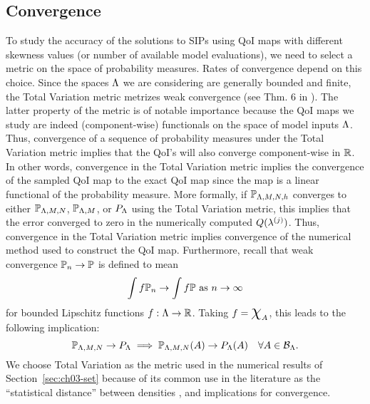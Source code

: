 \subsection{Convergence}
To study the accuracy of the solutions to SIPs using QoI maps with different skewness values (or number of available model evaluations), we need to select a metric on the space of probability measures.
Rates of convergence depend on this choice.
Since the spaces ${\Lambda}$ we are considering are generally bounded and finite, the Total Variation metric metrizes weak convergence (see Thm. 6 in \cite{GS02}).
The latter property of the metric is of notable importance because the QoI maps we study are indeed (component-wise) functionals on the space of model inputs ${\Lambda}$.
Thus, convergence of a sequence of probability measures under the Total Variation metric implies that the QoI's will also converge component-wise in $\mathbb{R}$.
In other words, convergence in the Total Variation metric implies the convergence of the sampled QoI map to the exact QoI map since the map is a linear functional of the probability measure.
More formally, if $\mathbb{P}_{{\Lambda},M,N,h}$ converges to either $\mathbb{P}_{{\Lambda},M,N}$, $\mathbb{P}_{{\Lambda},M}$, or $P_{\Lambda}$ using the Total Variation metric, this implies that the error converged to zero in the numerically computed $Q(\lambda^{(j)})$.
Thus, convergence in the Total Variation metric implies convergence of the numerical method used to construct the QoI map.
Furthermore, recall that weak convergence $\mathbb{P}_n \to \mathbb{P}$ is defined to mean
\[
\int f \mathbb{P}_n \to \int f \mathbb{P} \text{ as } n \to \infty
\]
for bounded Lipschitz functions $f:{\Lambda}\to\mathbb{R}$.
Taking $f = \Chi_A$, this leads to the following implication:
\[
\mathbb{P}_{{\Lambda}, M, N} \to P_{\Lambda} \implies \mathbb{P}_{{\Lambda}, M, N} (A) \to P_{\Lambda} (A) \quad \forall{A\in\mathcal{B}_{{\Lambda}}}.
\]
We choose Total Variation as the metric used in the numerical results of Section~\ref{sec:ch03-set} because of its common use in the literature as the ``statistical distance'' between densities \cite{GS02, Silverman}, and implications for convergence.



